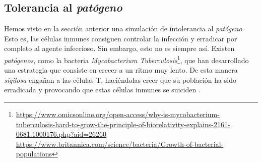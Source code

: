 %		
%



\subsection{Tolerancia al \textit{patógeno}}
\label{sim:toler}

Hemos visto en la sección anterior una simulación de intolerancia al \textit{patógeno}. Esto es, las células inmunes consiguen controlar la infección y erradicar por completo al agente infeccioso. Sin embargo, esto no es siempre así. Existen \textit{patógenos}, como la bacteria \textit{Mycobacterium Tuberculosis}\footnote{\url{https://www.omicsonline.org/open-access/why-is-mycobacterium-tuberculosis-hard-to-grow-the-principle-of-biorelativity-explains-2161-0681.1000176.php?aid=26260} \\ \url{https://www.britannica.com/science/bacteria/Growth-of-bacterial-populations}}, que han desarrollado una estrategia que consiste en crecer a un ritmo muy lento. De esta manera \textit{sigilosa} engañan a las células T, haciéndolas creer que su población ha sido erradicada y provocando que estas células inmunes se suiciden \citep{leggett2017growth}.

